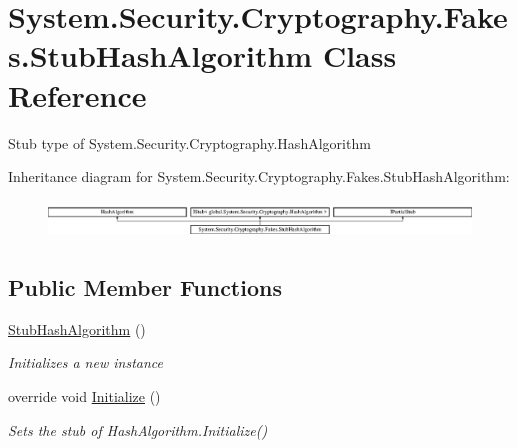 \hypertarget{class_system_1_1_security_1_1_cryptography_1_1_fakes_1_1_stub_hash_algorithm}{\section{System.\-Security.\-Cryptography.\-Fakes.\-Stub\-Hash\-Algorithm Class Reference}
\label{class_system_1_1_security_1_1_cryptography_1_1_fakes_1_1_stub_hash_algorithm}
}


Stub type of System.\-Security.\-Cryptography.\-Hash\-Algorithm 


Inheritance diagram for System.\-Security.\-Cryptography.\-Fakes.\-Stub\-Hash\-Algorithm\-:\begin{figure}[H]
\begin{center}
\leavevmode
\includegraphics[height=1.011743cm]{class_system_1_1_security_1_1_cryptography_1_1_fakes_1_1_stub_hash_algorithm}
\end{center}
\end{figure}
\subsection*{Public Member Functions}
\begin{DoxyCompactItemize}
\item 
\hyperlink{class_system_1_1_security_1_1_cryptography_1_1_fakes_1_1_stub_hash_algorithm_a3e60b500fa6b516acfefd77625ae05f2}{Stub\-Hash\-Algorithm} ()
\begin{DoxyCompactList}\small\item\em Initializes a new instance\end{DoxyCompactList}\item 
override void \hyperlink{class_system_1_1_security_1_1_cryptography_1_1_fakes_1_1_stub_hash_algorithm_a9a62ebaea47001f7b4307c5d8b1d0793}{Initialize} ()
\begin{DoxyCompactList}\small\item\em Sets the stub of Hash\-Algorithm.\-Initialize()\end{DoxyCompactList}\end{DoxyCompactItemize}
